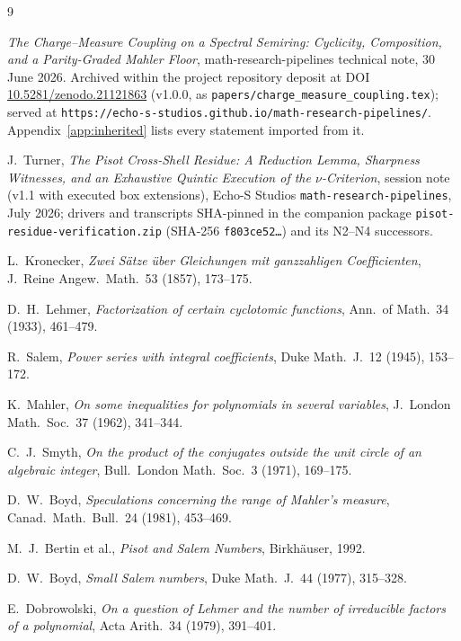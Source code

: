\documentclass[11pt]{article}
\theoremstyle{plain}
\theoremstyle{definition}
\theoremstyle{remark}
\begin{document}
\begin{thebibliography}{9}

 \emph{The Charge--Measure Coupling on a Spectral Semiring:
Cyclicity, Composition, and a Parity-Graded Mahler Floor},
math-research-pipelines technical note, 30 June 2026. Archived within the project repository deposit at DOI
\url{10.5281/zenodo.21121863} (v1.0.0, as
\texttt{papers/charge\_measure\_coupling.tex}); served at
\texttt{https://echo-s-studios.github.io/math-research-pipelines/}.
Appendix~\ref{app:inherited} lists every statement imported from it.

 J.~Turner, \emph{The Pisot Cross-Shell Residue: A
Reduction Lemma, Sharpness Witnesses, and an Exhaustive Quintic Execution
of the $\nu$-Criterion}, session note (v1.1 with executed box extensions),
Echo-S Studios \texttt{math-research-pipelines}, July 2026; drivers and
transcripts SHA-pinned in the companion package
\texttt{pisot-residue-verification.zip} (SHA-256 \texttt{f803ce52\ldots})
and its N2--N4 successors.

 L.~Kronecker, \emph{Zwei S\"atze \"uber Gleichungen mit
ganzzahligen Coefficienten}, J.~Reine Angew.~Math.\ 53 (1857), 173--175.

 D.~H.~Lehmer, \emph{Factorization of certain cyclotomic
functions}, Ann.\ of Math.\ 34 (1933), 461--479.

 R.~Salem, \emph{Power series with integral coefficients},
Duke Math.~J.\ 12 (1945), 153--172.

 K.~Mahler, \emph{On some inequalities for polynomials in
several variables}, J.~London Math.~Soc.\ 37 (1962), 341--344.

 C.~J.~Smyth, \emph{On the product of the conjugates outside the
unit circle of an algebraic integer}, Bull.~London Math.~Soc.\ 3 (1971),
169--175.

 D.~W.~Boyd, \emph{Speculations concerning the range of Mahler's
measure}, Canad.~Math.~Bull.\ 24 (1981), 453--469.

 M.~J.~Bertin et al., \emph{Pisot and Salem Numbers},
Birkh\"auser, 1992.

 D.~W.~Boyd, \emph{Small Salem numbers}, Duke Math.~J.\
44 (1977), 315--328.

 E.~Dobrowolski, \emph{On a question of Lehmer and the
number of irreducible factors of a polynomial}, Acta Arith.\ 34 (1979),
391--401.


\end{thebibliography}
\end{document}
